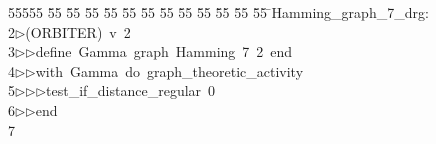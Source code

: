 %
%
\begin{tabbing}
55555 \= 55 \= 55 \= 55 \= 55 \= 55 \= 55 \= 55 \= 55 \= 55 \= 55 \= 55 \= 55 \= \>Hamming\_graph\_7\_drg:\\[0pt]
2\>$\triangleright$\>(ORBITER)\ v\ 2\ \\[0pt]
3\>$\triangleright$\>$\triangleright$\>define\ Gamma\ graph\ Hamming\ 7\ 2\ end\ \\[0pt]
4\>$\triangleright$\>$\triangleright$\>with\ Gamma\ do\ graph\_theoretic\_activity\ \\[0pt]
5\>$\triangleright$\>$\triangleright$\>$\triangleright$\>test\_if\_distance\_regular\ 0\ \\[0pt]
6\>$\triangleright$\>$\triangleright$\>end\\[0pt]
7\>\end{tabbing}

